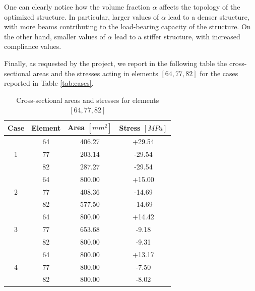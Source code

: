 One can clearly notice how the volume fraction $\alpha$ affects the topology of the optimized structure.
In particular, larger values of $\alpha$ lead to a denser structure, with more beams contributing to the load-bearing capacity of the structure.
On the other hand, smaller values of $\alpha$ lead to a stiffer structure, with increased compliance values.

Finally, as requested by the project, we report in the following table the cross-sectional areas and the stresses acting in elements $[64, 77, 82]$ for the cases reported in Table \ref{tab:cases}.

\begin{table}[H]
    \centering

    \begin{tabular}{|c|c|c|c|}
        \hline

        \textbf{Case}      & \textbf{Element} & \textbf{Area $[mm^2]$} & \textbf{Stress $[MPa]$} \\
        \hline
        \multirow{3}{*}{1} & 64               & 406.27                 & +29.54                  \\
                           & 77               & 203.14                 & -29.54                  \\
                           & 82               & 287.27                 & -29.54                  \\
        \hline
        \multirow{3}{*}{2} & 64               & 800.00                 & +15.00                  \\
                           & 77               & 408.36                 & -14.69                  \\
                           & 82               & 577.50                 & -14.69                  \\
        \hline
        \multirow{3}{*}{3} & 64               & 800.00                 & +14.42                  \\
                           & 77               & 653.68                 & -9.18                   \\
                           & 82               & 800.00                 & -9.31                   \\
        \hline
        \multirow{3}{*}{4} & 64               & 800.00                 & +13.17                  \\
                           & 77               & 800.00                 & -7.50                   \\
                           & 82               & 800.00                 & -8.02                   \\
        \hline
    \end{tabular}

    \caption{Cross-sectional areas and stresses for elements $[64, 77, 82]$}
    \label{tab:cb_results}

\end{table}

